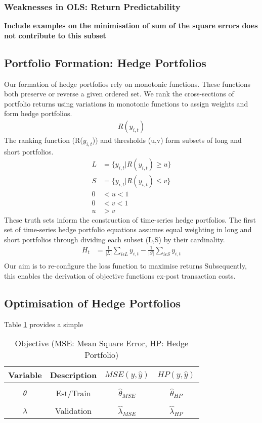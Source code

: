\documentclass[12pt]{article}
\begin{document}
\subsubsection{Weaknesses in OLS: Return Predictability}
\textbf{Include examples on the minimisation of sum of the square errors does not contribute to this subset}
\subsection{Portfolio Formation: Hedge Portfolios}
Our formation of hedge portfolios rely on monotonic functions.
These functions both preserve or reverse a given ordered set.
We rank the cross-sections of portfolio returns using variations in monotonic functions to assign weights and form hedge portfolios.
\begin{align}
	R(y_{i,t})
\end{align}
The ranking function (R($y_{i,t}$)) and thresholds (u,v) form subsets of long and short portfolios.
\begin{align}
	L &= \{ y_{i,t} | R(y_{i,t})\geq u\}\\
	S &= \{ y_{i,t} | R(y_{i,t})\leq v\}\\
	0 & < u < 1\\
	0 & < v < 1\\
	u & > v
\end{align}
These truth sets inform the construction of time-series hedge portfolios. 
The first set of time-series hedge portfolio equations assumes equal weighting in long and short portfolios through dividing each subset (L,S) by their cardinality. 
\begin{align}
	H_t &= \frac{1}{|L|}\sum_{i\epsilon L} y_{i,t} - \frac{1}{|S|}\sum_{i\epsilon S} y_{i,t}\\
\end{align}
Our aim is to re-configure the loss function to maximise returns 
Subsequently, this enables the derivation of objective functions ex-post transaction costs.
\subsection{Optimisation of Hedge Portfolios}
Table \ref{hpt} provides a simple 
	\begin{table}[H]
		\centering
		\begin{tabular}{||c|c|c|c||}
			\hline
			Variable & Description & $ MSE(y,\hat{y}) $ & $ HP(y,\hat{y}) $\\ [0.5ex]
			\hline
			&&&\\
			$\theta$ & Est/Train& $ \hat{\theta}_{MSE}$& $ \hat{\theta}_{HP}$ \\ [0.5ex]
			\hline
			&&&\\
			$\lambda$ & Validation & $\hat{\lambda}_{MSE}$ & $\hat{\lambda}_{HP}$\\ [1.0ex]
			\hline
		\end{tabular}
	\caption{Objective (MSE: Mean Square Error, HP: Hedge Portfolio)}
	\label{hpt}
\end{table}
\newpage
\end{document}
